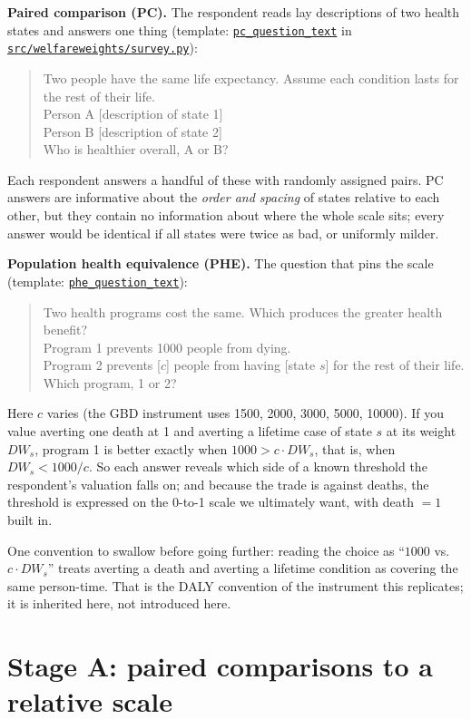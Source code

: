 \documentclass[11pt]{article}
\newcommand{\repo}{https://github.com/welfareweights/engine}
\newcommand{\src}[1]{\href{\repo/blob/main/#1}{\texttt{#1}}}
\newcommand{\fn}[1]{\href{https://github.com/search?q=repo\%3Awelfareweights\%2Fengine+symbol\%3A#1\&type=code}{\texttt{#1}}}
\begin{document}
\textbf{Paired comparison (PC).} The respondent reads lay descriptions of two health states and answers one thing (template: \fn{pc\_question\_text} in \src{src/welfareweights/survey.py}):

\begin{quote}
Two people have the same life expectancy. Assume each condition lasts for the rest of their life.\\
Person A [description of state 1]\\
Person B [description of state 2]\\
Who is healthier overall, A or B?
\end{quote}

Each respondent answers a handful of these with randomly assigned pairs. PC answers are informative about the \emph{order and spacing} of states relative to each other, but they contain no information about where the whole scale sits; every answer would be identical if all states were twice as bad, or uniformly milder.

\textbf{Population health equivalence (PHE).} The question that pins the scale (template: \fn{phe\_question\_text}):

\begin{quote}
Two health programs cost the same. Which produces the greater health benefit?\\
Program 1 prevents 1000 people from dying.\\
Program 2 prevents [$c$] people from having [state $s$] for the rest of their life.\\
Which program, 1 or 2?
\end{quote}

Here $c$ varies (the GBD instrument uses 1500, 2000, 3000, 5000, 10000). If you value averting one death at 1 and averting a lifetime case of state $s$ at its weight $DW_s$, program 1 is better exactly when $1000 > c \cdot DW_s$, that is, when $DW_s < 1000/c$. So each answer reveals which side of a known threshold the respondent's valuation falls on; and because the trade is against deaths, the threshold is expressed on the 0-to-1 scale we ultimately want, with death $=1$ built in.

One convention to swallow before going further: reading the choice as ``$1000$ vs.\ $c \cdot DW_s$'' treats averting a death and averting a lifetime condition as covering the same person-time. That is the DALY convention of the instrument this replicates; it is inherited here, not introduced here.

\section{Stage A: paired comparisons to a relative scale}
\end{document}
